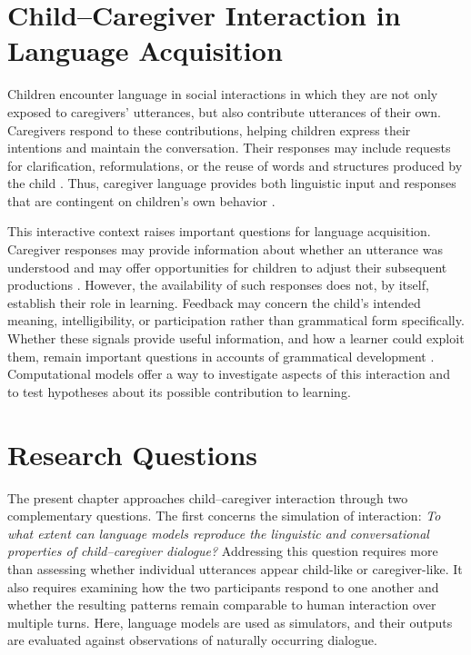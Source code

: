 \section{Child--Caregiver Interaction in Language Acquisition}

Children encounter language in social interactions in which they are not only exposed to caregivers' utterances, but also contribute utterances of their own. Caregivers respond to these contributions, helping children express their intentions and maintain the conversation. Their responses may include requests for clarification, reformulations, or the reuse of words and structures produced by the child \citep{clark_conversational_2020, fusaroli_caregiver_2023}. Thus, caregiver language provides both linguistic input and responses that are contingent on children's own behavior \citep{masek_where_2021}.

This interactive context raises important questions for language acquisition. Caregiver responses may provide information about whether an utterance was understood and may offer opportunities for children to adjust their subsequent productions \citep{nikolaus2023communicative}. However, the availability of such responses does not, by itself, establish their role in learning. Feedback may concern the child's intended meaning, intelligibility, or participation rather than grammatical form specifically. Whether these signals provide useful information, and how a learner could exploit them, remain important questions in accounts of grammatical development \citep{demetras_feedback_1986, marcus_negative_1993}. Computational models offer a way to investigate aspects of this interaction and to test hypotheses about its possible contribution to learning.

\section{Research Questions}

The present chapter approaches child--caregiver interaction through two complementary questions. The first concerns the simulation of interaction: \textit{To what extent can language models reproduce the linguistic and conversational properties of child--caregiver dialogue?} Addressing this question requires more than assessing whether individual utterances appear child-like or caregiver-like. It also requires examining how the two participants respond to one another and whether the resulting patterns remain comparable to human interaction over multiple turns. Here, language models are used as simulators, and their outputs are evaluated against observations of naturally occurring dialogue.

